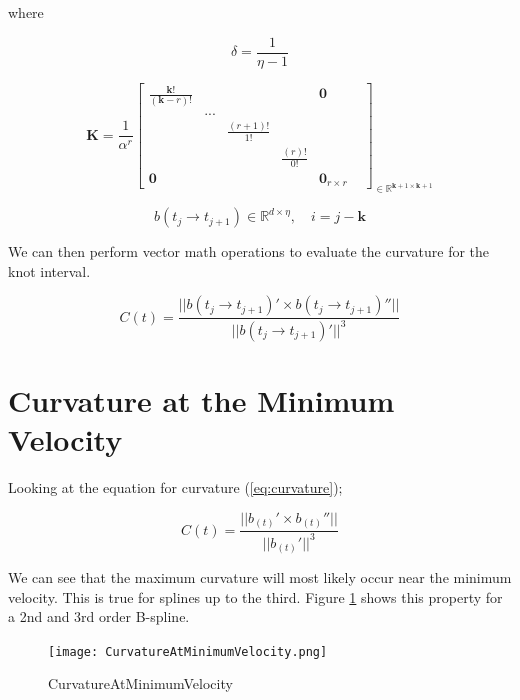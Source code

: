 \documentclass{article}
\begin{document}
where

\begin{equation}
    \delta = \frac{1}{\eta-1}
\end{equation}

\begin{equation}
    \textbf{K} = \frac{1}{\alpha^r}\begin{bmatrix} \frac{\textbf{k}!}{(\textbf{k}-r)!} & & & &  \textbf{0}\\ 
    & ... & & & & 
    \\ 
    & &  \frac{(r+1)!}{1!} & &
    \\  & & & \frac{(r)!}{0!} &
    \\ \textbf{0} &  & & & \textbf{0}_{r \times r} \end{bmatrix}_{\in \mathbb{R}^{\textbf{k}+1 \times \textbf{k}+1}}
\end{equation}

\begin{equation}
    b(t_j \rightarrow t_{j+1}) \in \mathbb{R}^{d \times \eta}, \quad i = j-\textbf{k}
\end{equation}

We can then perform vector math operations to evaluate the curvature for the knot interval.

\begin{equation}
    C(t) = \frac{||b(t_j \rightarrow t_{j+1})' \times b(t_j \rightarrow t_{j+1})''||}{||b(t_j \rightarrow t_{j+1})'||^3}
\end{equation}

\section{Curvature at the Minimum Velocity} \label{Curvature at Min Velocity}

Looking at the equation for curvature (\ref{eq:curvature});

\begin{equation}
    C(t) = \frac{||b_{(t)}' \times b_{(t)}''||}{||b_{(t)}'||^3}
\end{equation}

We can see that the maximum curvature will most likely occur near the minimum velocity. This is true for splines up to the third. Figure \ref{Time at minimum velocity and maximum curvature} shows this property for a 2nd and 3rd order B-spline. 

\begin{figure}[H]
\centering
\texttt{[image: CurvatureAtMinimumVelocity.png]}
\caption{CurvatureAtMinimumVelocity}
\label{Time at minimum velocity and maximum curvature}
\end{figure}
\end{document}
